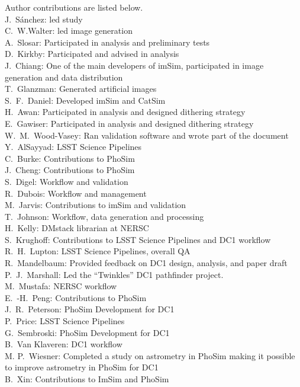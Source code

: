 Author contributions are listed below. \\
J.~S\'{a}nchez: led study \\
C.~W.Walter: led image generation \\
A.~Slosar: Participated in analysis and preliminary tests \\
D.~Kirkby: Participated and advised in analysis \\
J.~Chiang: One of the main developers of imSim, participated in image generation and data distribution \\
T.~Glanzman: Generated artificial images \\
S.~F.~Daniel: Developed imSim and CatSim \\
H.~Awan: Participated in analysis and designed dithering strategy \\
E.~Gawiser: Participated in analysis and designed dithering strategy \\
W.~M.~Wood-Vasey: Ran validation software and wrote part of the document \\
Y.~AlSayyad: LSST Science Pipelines \\
C.~Burke: Contributions to PhoSim \\
J.~Cheng: Contributions to PhoSim \\
S.~Digel: Workflow and validation \\
R.~Dubois: Workflow and management \\
M.~Jarvis: Contributions to imSim and validation \\
T.~Johnson: Workflow, data generation and processing \\
H.~Kelly: DMstack librarian at NERSC \\
S.~Krughoff: Contributions to LSST Science Pipelines and DC1 workflow \\
R.~H.~Lupton: LSST Science Pipelines, overall QA \\
R.~Mandelbaum: Provided feedback on DC1 design, analysis, and paper draft \\
P.~J.~Marshall: Led the ``Twinkles'' DC1 pathfinder project. \\
M.~Mustafa: NERSC workflow \\
E.~-H.~Peng: Contributions to PhoSim \\
J.~R.~Peterson: PhoSim Development for DC1 \\
P.~Price: LSST Science Pipelines \\
G.~Sembroski: PhoSim Development for DC1 \\
B.~Van Klaveren: DC1 workflow \\
M. P.~Wiesner: Completed a study on astrometry in PhoSim making it possible to improve astrometry in PhoSim for DC1 \\
B.~Xin: Contributions to ImSim and PhoSim \\
